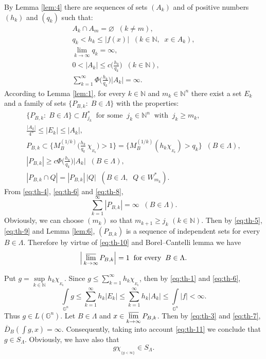 \documentclass[12pt,reqno]{article}
\theoremstyle{remark}
\newcommand{\olim}{\operatornamewithlimits{\overline{lim}}}
\begin{document}
By Lemma \ref{lem:4} there are sequences of sets $(A_k)$ and of positive numbers $(h_k)$ and $(q_k)$ such that:
\begin{gather}
    A_k\cap A_m=\varnothing \;\; (k\neq m), \label{eq:th-1} \\
    q_k<h_k\leq|f(x)| \;\; (k\in\mathbb{N}, \;\; x\in A_k), \label{eq:th-2} \\
    \lim_{k\to\infty} q_k=\infty, \label{eq:th-3} \\
    0<|A_k|\leq c\Big(\frac{h_k}{q_k}\Big) \;\; (k\in\mathbb{N}), \nonumber \\
   \sum_{k=1}^\infty \Phi\Big(\frac{h_k}{q_k}\Big)|A_k|=\infty. \label{eq:th-4}
\end{gather}
According to Lemma \ref{lem:1}, for every $k\in\mathbb{N}$ and $m_k\in\mathbb{N}^n$ there exist a set $E_k$ and a family of sets $\{P_{B,k}:\;B\in\Lambda\}$ with the properties:
\begin{gather}
    \big\{P_{B,k}:\;B\in\Lambda\big\}\subset H_{j_k}^{*} \;\;\text{for some}\;\;
            j_k\in\mathbb{N}^n \;\;\text{with}\;\; j_k\geq m_k, \label{eq:th-5} \\
    \frac{|A_k|}{4^n}\leq |E_k|\leq |A_k|, \label{eq:th-6} \\
    P_{B,k}\subset\bigg\{M_B^{(1/k)}\Big(\frac{h_k}{q_k}\,\chi_{{}_{E_k}}\Big)>1\bigg\}=
            \big\{M_B^{(1/k)}(h_k\chi_{{}_{E_k}})>q_k\big\} \;\; (B\in\Lambda), \label{eq:th-7} \\
    |P_{B,k}|\geq c\Phi\Big(\frac{h_k}{q_k}\Big)|A_k| \;\; (B\in\Lambda), \label{eq:th-8} \\
    |P_{B,k}\cap Q|=|P_{B,k}|\,|Q| \;\; (B\in\Lambda, \;\; Q\in W_{m_k}^{*}). \label{eq:th-9}
\end{gather}
From \eqref{eq:th-4}, \eqref{eq:th-6} and \eqref{eq:th-8},
\begin{equation}\label{eq:th-10}
    \sum_{k=1}^\infty |P_{B,k}|=\infty \;\; (B\in\Lambda).
\end{equation}
Obviously, we can choose $(m_k)$ so that $m_{k+1}\geq j_k$ $(k\in\mathbb{N})$. Then by \eqref{eq:th-5}, \eqref{eq:th-9} and Lemma \ref{lem:6}, $(P_{B,k})$ is a sequence of independent sets for every $B\in\Lambda$. Therefore by virtue of \eqref{eq:th-10} and Borel--Cantelli lemma we have
\begin{equation}\label{eq:th-11}
    \Big|\olim_{k\to\infty} P_{B,k}\Big|=1 \;\;\text{for every}\;\; B\in\Lambda.
\end{equation}

Put $g=\sup\limits_{k\in\mathbb{N}} h_k\chi_{{}_{E_k}}$. Since $g\leq\sum\limits_{k=1}^\infty h_k\chi_{{}_{E_k}}$, then by  \eqref{eq:th-1} and \eqref{eq:th-6},
$$  \int\limits_{\mathbb{G}^n} g\leq \sum_{k=1}^\infty h_k|E_k|\leq \sum_{k=1}^\infty h_k|A_k|\leq \int\limits_{\mathbb{G}^n} |f|<\infty.   $$
Thus $g\in L(\mathbb{G}^n)$. Let $B\in\Lambda$ and $x\in\olim\limits_{k\to\infty} P_{B,k}$. Then by \eqref{eq:th-3} and \eqref{eq:th-7}, $\overline{D}_B(\int g,x)=\infty$. Consequently, taking into account \eqref{eq:th-11} we conclude that $g\in S_\Lambda$. Obviously, we have also that
\begin{equation}\label{eq:th-12}
    g\chi_{{}_{\{g<\infty\}}}\in S_\Lambda.
\end{equation}
\end{document}
